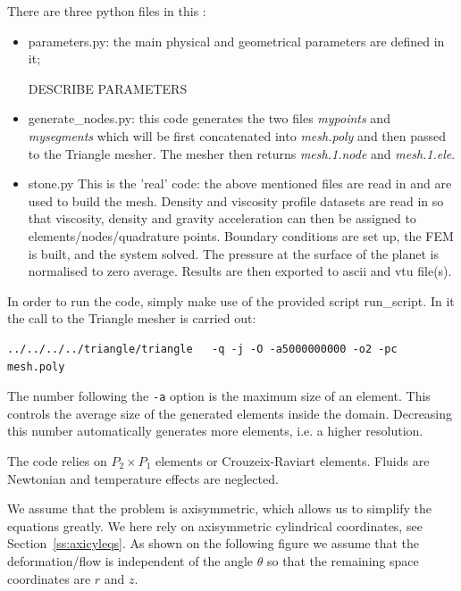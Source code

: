 There are three python files in this \stone:
\begin{itemize}
\item {\pythonfile parameters.py}: the main physical and geometrical parameters are defined in it;

DESCRIBE PARAMETERS

\item {\pythonfile generate\_nodes.py}: this code generates the two files  {\sl mypoints} and {\sl mysegments}
which will be first concatenated into {\sl mesh.poly} and then passed to the Triangle mesher. 
The mesher then returns {\sl mesh.1.node} and {\sl mesh.1.ele}.  
\item {\pythonfile stone.py} This is the 'real' code: the above mentioned files are read in and are used to 
build the mesh. Density and viscosity profile datasets are read in so that viscosity, density and 
gravity acceleration can then be assigned to elements/nodes/quadrature points. Boundary conditions 
are set up, the FEM is built, and the system solved. The pressure at the surface of the planet is 
normalised to zero average. Results are then exported to ascii and vtu file(s).
\end{itemize}
In order to run the code, simply make use of the provided script {\shellscriptfile run\_script}. 
In it the call to the Triangle mesher is carried out:
\begin{verbatim}
../../../../triangle/triangle   -q -j -O -a5000000000 -o2 -pc  mesh.poly
\end{verbatim}
The number following the {\tt -a} option is the maximum size of an element. This controls the 
average size of the generated elements inside the domain. Decreasing this number automatically 
generates more elements, i.e. a higher resolution. 

The code relies on $P_2\times P_1$ elements or Crouzeix-Raviart elements. Fluids are Newtonian and 
temperature effects are neglected. 

We assume that the problem is axisymmetric, which allows us to simplify the equations greatly. 
We here rely on axisymmetric cylindrical coordinates, see Section~\ref{ss:axicyleqs}.
As shown on the following figure we assume that the deformation/flow is independent of the angle 
$\theta$ so that the remaining space coordinates are $r$ and $z$.
\begin{center}

\end{center}


